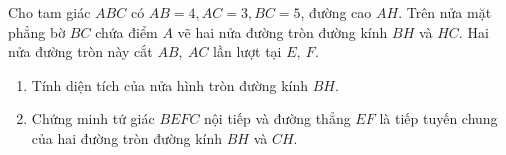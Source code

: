 \begin{ex}%
	Cho tam giác $ABC$ có $AB = 4, AC = 3, BC = 5$, đường cao $AH$. Trên nửa mặt phẳng bờ $BC$ chứa điểm $A$ vẽ hai nửa đường tròn đường kính $BH$ và $HC$. Hai nửa đường tròn này cắt $AB,\ AC $ lần lượt tại $E,\ F$.
	\begin{enumerate}
	\item Tính diện tích của nửa hình tròn đường kính $BH.$
	\item Chứng minh tứ giác $BEFC$ nội tiếp và đường thẳng $EF$ là tiếp tuyến chung của hai đường tròn đường kính $BH$ và $CH$.
	\end{enumerate}
\end{ex}
